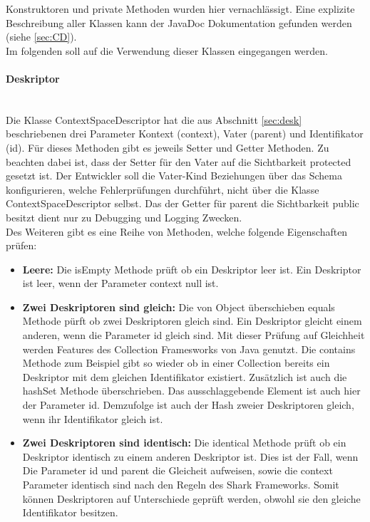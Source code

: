 \documentclass[a4paper]{article}
\begin{document}
	\newpage
	Konstruktoren und private Methoden wurden hier vernachlässigt. Eine
	explizite Beschreibung aller Klassen kann der JavaDoc Dokumentation gefunden
	werden (siehe \autoref{sec:CD}). \\
	
	Im folgenden soll auf die Verwendung dieser Klassen eingegangen werden.
		
	\paragraph{Deskriptor}\mbox{} \\
	
	Die Klasse ContextSpaceDescriptor hat die aus Abschnitt \ref{sec:desk} 
	beschriebenen drei Parameter Kontext (context), Vater (parent) und
	Identifikator (id). Für dieses Methoden gibt es jeweils Setter und Getter
	Methoden. Zu beachten dabei ist, dass der Setter für den Vater auf die
	Sichtbarkeit protected gesetzt ist. Der Entwickler soll die	Vater-Kind
	Beziehungen über das Schema konfigurieren, welche Fehlerprüfungen durchführt,
	nicht über die Klasse ContextSpaceDescriptor selbst. Das der Getter für
	parent die Sichtbarkeit public besitzt dient nur zu Debugging und Logging
	Zwecken.\\
	
	Des Weiteren gibt es eine Reihe von Methoden, welche folgende Eigenschaften
	prüfen:
	
	\begin{itemize}
		\item \textbf{Leere:} Die isEmpty Methode prüft ob ein Deskriptor
		leer ist. Ein Deskriptor ist leer, wenn der Parameter context null ist.
		\item \textbf{Zwei Deskriptoren sind gleich:} Die von Object überschieben
		equals Methode pürft ob zwei Deskriptoren gleich sind. Ein Deskriptor
		gleicht einem anderen, wenn die Parameter id gleich sind. Mit dieser
		Prüfung	auf Gleichheit werden Features des Collection Framesworks 
		von Java genutzt. Die contains Methode zum Beispiel gibt so wieder ob
		in einer Collection bereits ein Deskriptor mit dem gleichen Identifikator
		existiert. Zusätzlich ist auch die hashSet Methode überschrieben. Das
		ausschlaggebende Element ist auch hier der Parameter id. Demzufolge
		ist auch der Hash zweier Deskriptoren gleich, wenn ihr Identifikator 
		gleich ist.
		\item \textbf{Zwei Deskriptoren sind identisch:} Die identical Methode
		prüft ob ein Deskriptor identisch zu einem anderen Deskriptor ist. Dies
		ist der Fall, wenn Die Parameter id und parent die Gleicheit aufweisen,
		sowie die context Parameter identisch sind nach den Regeln des Shark
		Frameworks. Somit können Deskriptoren auf Unterschiede geprüft werden,
		obwohl sie den gleiche Identifikator besitzen.
	\end{itemize}
	
\end{document}
